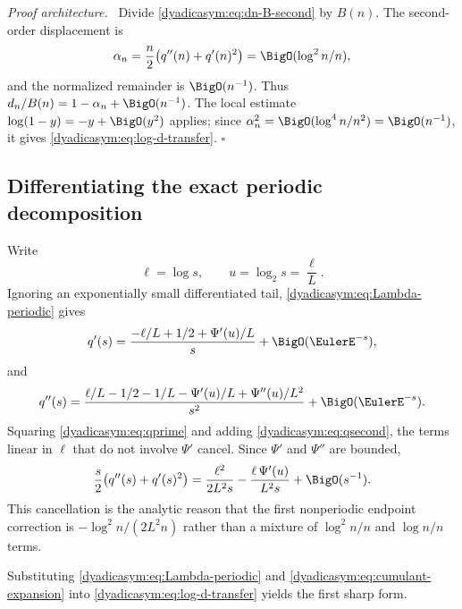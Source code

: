 \documentclass[11pt,oneside]{article}
\theoremstyle{definition}
\theoremstyle{remark}
\newenvironment{proofidea}{\par\smallskip\noindent\textit{Proof architecture.}\ }{\hfill$\square$\par\smallskip}
\begin{document}
\begin{proofidea}
Divide \eqref{dyadicasym:eq:dn-B-second} by $B(n)$.  The second-order displacement is
\begin{equation*}
 \alpha_n=\frac n2\bigl(q''(n)+q'(n)^2\bigr)
          =\BigO(\log^2n/n),
\end{equation*}
and the normalized remainder is $\BigO(n^{-1})$.  Thus
$d_n/B(n)=1-\alpha_n+\BigO(n^{-1})$.  The local estimate
$\log(1-y)=-y+\BigO(y^2)$ applies; since
$\alpha_n^2=\BigO(\log^4n/n^2)=\BigO(n^{-1})$, it gives
\eqref{dyadicasym:eq:log-d-transfer}.
\end{proofidea}

\subsection{Differentiating the exact periodic decomposition}

Write
\begin{equation}
 \ell=\log s,
 \qquad
 u=\log_2s=\frac\ell L.                                    \label{dyadicasym:eq:ell-u}
\end{equation}
Ignoring an exponentially small differentiated tail, \eqref{dyadicasym:eq:Lambda-periodic} gives
\begin{equation}
 q'(s)=\frac{-\ell/L+1/2+\Psi'(u)/L}{s}+\BigO(\EulerE^{-s}),     \label{dyadicasym:eq:qprime}
\end{equation}
and
\begin{equation}
 q''(s)=\frac{\ell/L-1/2-1/L-\Psi'(u)/L+\Psi''(u)/L^2}{s^2}
 +\BigO(\EulerE^{-s}).                                           \label{dyadicasym:eq:qsecond}
\end{equation}
Squaring \eqref{dyadicasym:eq:qprime} and adding \eqref{dyadicasym:eq:qsecond}, the terms linear in $\ell$ that do
not involve $\Psi'$ cancel.  Since $\Psi'$ and $\Psi''$ are bounded,
\begin{equation}
 \frac s2\bigl(q''(s)+q'(s)^2\bigr)
 =\frac{\ell^2}{2L^2s}-
   \frac{\ell\,\Psi'(u)}{L^2s}+\BigO(s^{-1}).              \label{dyadicasym:eq:cumulant-expansion}
\end{equation}
This cancellation is the analytic reason that the first nonperiodic endpoint correction is
$-\log^2n/(2L^2n)$ rather than a mixture of $\log^2n/n$ and $\log n/n$ terms.

Substituting \eqref{dyadicasym:eq:Lambda-periodic} and \eqref{dyadicasym:eq:cumulant-expansion} into
\eqref{dyadicasym:eq:log-d-transfer} yields the first sharp form.
\end{document}
